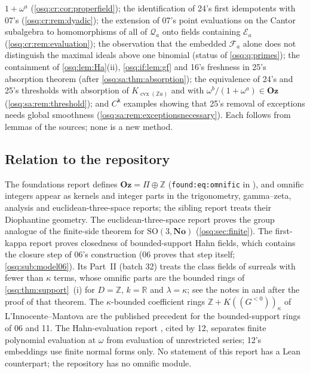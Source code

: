 \documentclass[11pt,letterpaper]{article}
\numberwithin{equation}{section}
\theoremstyle{definition}
\theoremstyle{remark}
\theoremstyle{plain}
\newcommand{\No}{\mathbf{No}}
\newcommand{\Oz}{\mathbf{Oz}}
\newcommand{\Z}{\mathbb Z}
\newcommand{\R}{\mathbb R}
\newcommand{\FF}{\mathscr F}         %
\newcommand{\EE}{\mathscr E}         %
\newcommand{\Qa}{\mathcal Q}         %
\begin{document}
$1+\omega^a$ (\cref{osq:cr:cor:properfield}); the identification of 24's first idempotents with 07's (\cref{osq:cr:rem:dyadic}); the extension of 07's
point evaluations on the Cantor subalgebra to homomorphisms of all of $\Qa_a$ onto fields containing $\EE_a$ (\cref{osq:cr:rem:evaluation}); the
observation that the embedded $\FF_a$ alone does not distinguish the maximal ideals above one binomial (status of \cref{osq:q:primes}); the
containment of \cref{osq:lem:Ha}(ii), \cref{osq:if:lem:gf} and 16's freshness in 25's absorption theorem (after \cref{osq:sa:thm:absorption}); the
equivalence of 24's and 25's thresholds with absorption of $K_{\operatorname{cvx}(\Z a)}$ and with $\omega^b/(1+\omega^a)\in\Oz$
(\cref{osq:sa:rem:threshold}); and $C^{\mathsf k}$ examples showing that 25's removal of exceptions needs global smoothness
(\cref{osq:sa:rem:exceptionsnecessary}).
Each follows from lemmas of the sources; none is a new method.

\subsection{Relation to the repository}\label{osq:sub:repository}
The foundations report defines $\Oz=\Pi\oplus\Z$ (\nolinkurl{found:eq:omnific} in
\cite{RepoFound}), and omnific integers appear as kernels and integer parts in the trigonometry,
gamma--zeta, analysis and euclidean-three-space reports; the sibling report \cite{RepoOdg} treats
their Diophantine geometry. The euclidean-three-space report proves the group analogue of the
finite-side theorem for $\mathrm{SO}(3,\No)$ (\cref{osq:sec:finite}). The first-kappa report proves
closedness of bounded-support Hahn fields, which contains the closure step of 06's construction
(06 proves that step itself; \cref{osq:sub:model06}). Its Part~II (batch 32) treats the class fields of surreals
with fewer than $\kappa$ terms, whose omnific parts are the bounded rings of \cref{osq:thm:support}~(i) for $D=\Z$,
$k=\R$ and $\lambda=\kappa$; see the notes in and after the proof of that theorem. The
$\kappa$-bounded coefficient rings $\Z+K(\!(G^{<0})\!)_\kappa$ of L'Innocente--Mantova \cite{LM} are
the published precedent for the bounded-support rings of 06 and 11. The Hahn-evaluation report
\cite{RepoHahnEval}, cited by 12, separates finite polynomial evaluation at $\omega$ from evaluation of
unrestricted series; 12's embeddings use finite normal forms only. No statement of this report
has a Lean counterpart; the repository has no omnific module.
\end{document}
